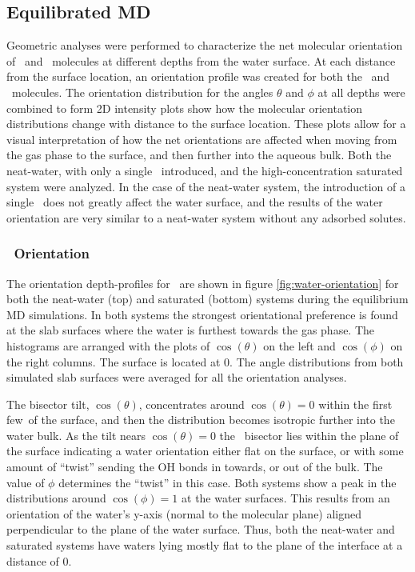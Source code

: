 \subsection{Equilibrated MD}

Geometric analyses were performed to characterize the net molecular orientation of \wat~and \suldiox~molecules at different depths from the water surface. At each distance from the surface location, an orientation profile was created for both the \wat~and \suldiox~molecules. The orientation distribution for the angles $\theta$ and $\phi$ at all depths were combined to form 2D intensity plots show how the molecular orientation distributions change with distance to the surface location. These plots allow for a visual interpretation of how the net orientations are affected when moving from the gas phase to the surface, and then further into the aqueous bulk. Both the neat-water, with only a single \suldiox~introduced, and the high-concentration saturated system were analyzed. In the case of the neat-water system, the introduction of a single \suldiox~does not greatly affect the water surface, and the results of the water orientation are very similar to a neat-water system without any adsorbed solutes.

\subsubsection{\wat~Orientation}

The orientation depth-profiles for \wat~are shown in figure \ref{fig:water-orientation} for both the neat-water (top) and saturated (bottom) systems during the equilibrium MD simulations. In both systems the strongest orientational preference is found at the slab surfaces where the water is furthest towards the gas phase. The histograms are arranged with the plots of $\cos(\theta)$ on the left and $\cos(\phi)$ on the right columns. The surface is located at 0\angs. The angle distributions from both simulated slab surfaces were averaged for all the orientation analyses.

The bisector tilt, $\cos(\theta)$, concentrates around $\cos(\theta)=0$ within the first few\angs~of the surface, and then the distribution becomes isotropic further into the water bulk. As the tilt nears $\cos(\theta)=0$ the \wat~bisector lies within the plane of the surface indicating a water orientation either flat on the surface, or with some amount of ``twist'' sending the OH bonds in towards, or out of the bulk. The value of $\phi$ determines the ``twist'' in this case. Both systems show a peak in the distributions around $\cos(\phi)=1$ at the water surfaces. This results from an orientation of the water's y-axis (normal to the molecular plane) aligned perpendicular to the plane of the water surface. Thus, both the neat-water and saturated systems have waters lying mostly flat to the plane of the interface at a distance of 0\angs.

